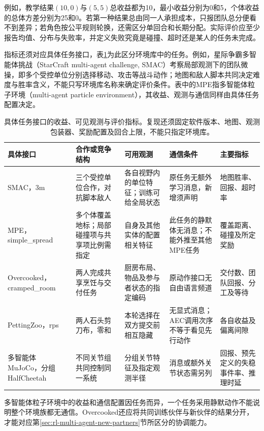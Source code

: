 例如，教学结果$(10,0)$与$(5,5)$总收益都为10，最小收益分别为0和5，个体收益的总体方差分别为25和0。若第一种结果总由同一人承担成本，只报团队总分便看不到差异；若角色按公平规则轮换，还需区分单回合和长期分配。实际评价应至少报告均值、分布与失败率，并定义失败究竟是碰撞、超时还是某人的任务未完成。

指标还须对应具体任务接口，表\ref{tab:rl-multi-agent-benchmarks}为此区分环境库中的任务。例如，星际争霸多智能体挑战（StarCraft multi-agent challenge, SMAC）考察局部观测下的团队微操，即多个受控单位分别选择移动、攻击等战斗动作；地图和敌人脚本共同决定难度与胜率含义，不能只写环境库名称来确定评价条件。表中的MPE指多智能体粒子环境（multi-agent particle environment），其收益、观测与通信同样由具体任务配置决定。

\begin{table}[t]
 \centering
 \begin{tabularx}{\linewidth}{@{}l >{\raggedright\arraybackslash}X >{\raggedright\arraybackslash}X >{\raggedright\arraybackslash}X >{\raggedright\arraybackslash}X@{}}
 \toprule
 具体接口 & 合作或竞争结构 & 可用观测 & 通信条件 & 主要指标\\
 \midrule
 SMAC，3m & 三个受控单位合作，对抗脚本敌人 & 各自视野内的单位特征；训练可给全局状态 & 原任务无额外学习消息，新增须声明 & 地图胜率、回报、超时率\\
 MPE，simple\_spread & 多个体覆盖地标；局部碰撞项与共享项比例需指定 & 自身及其他实体的配置相关特征 & 此任务的静默体无消息；不能外推至其他MPE任务 & 覆盖距离、碰撞及所定奖励\\
 Overcooked，cramped\_room & 两人完成共享烹饪与交付任务 & 厨房布局、物品及参与者状态的指定编码 & 原动作接口无自由语言频道 & 交付数、团队回报、分工及等待\\
 PettingZoo，rps & 两人石头剪刀布，零和 & 本轮选择在双方提交前相互隐藏 & 无显式消息；AEC调用次序不等于看见先行动作 & 各自收益及偏离间隙\\
 多智能体MuJoCo，分组HalfCheetah & 不同关节组共同控制同一系统 & 分组关节特征及指定观测半径 & 消息或额外关节状态需另列 & 回报、预先定义的失稳事件率、推理时延\\
 \bottomrule
 \end{tabularx}
 \caption{具体任务接口的收益、可见观测与评价指标。复现还须固定软件版本、地图、观测包装器、奖励配置及回合上限，不能只指定环境库。}
 \label{tab:rl-multi-agent-benchmarks}
\end{table}

多智能体粒子环境中的收益和通信配置因任务而异，一个任务采用静默动作不能说明整个环境族都无通信。Overcooked还应将共同训练伙伴与新伙伴的结果分开，才能对应第\ref{sec:rl-multi-agent-new-partners}节所区分的协调能力。

